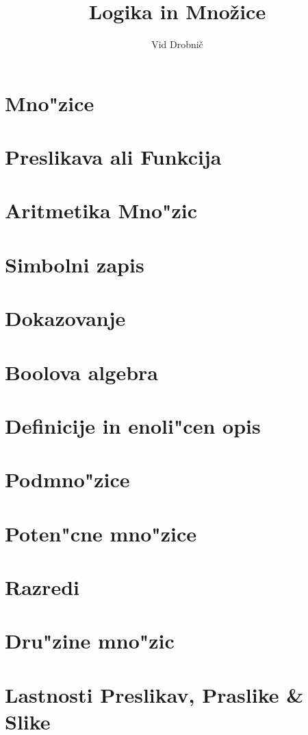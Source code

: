 \documentclass[a4paper, 12pt]{article}
\title{Logika in Množice}
\author{Vid Drobnič}
\date{}
\begin{document}
	\maketitle
	\thispagestyle{empty}
	\pagebreak
	\setcounter{page}{1}
	
	\tableofcontents
	\pagebreak
	
	\section{Mno"zice}
	
	
	\section{Preslikava ali Funkcija}
	
	
	\section{Aritmetika Mno"zic}
	
	
	\section{Simbolni zapis}
	
	
	\section{Dokazovanje}
	
	
	\section{Boolova algebra}
	
	
	\section{Definicije in enoli"cen opis}
	
	
	\section{Podmno"zice}
	
	
	\section{Poten"cne mno"zice}
	
	
	\section{Razredi}
	
	
	\section{Dru"zine mno"zic}
	
	
	\section{Lastnosti Preslikav, Praslike \& Slike}
	
\end{document}
